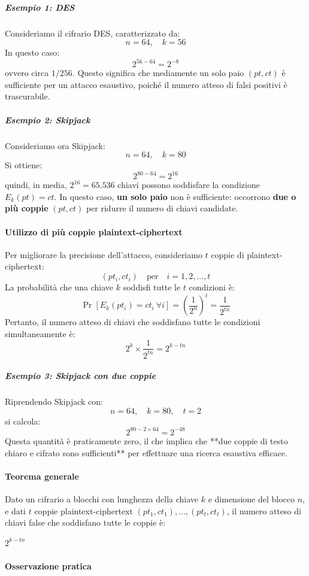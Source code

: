 \documentclass{report}
\begin{document}
\subparagraph{Esempio 1: DES}

Consideriamo il cifrario DES, caratterizzato da:
\[
n = 64, \quad k = 56
\]
In questo caso:
\[
2^{56-64} = 2^{-8}
\]
ovvero circa $1/256$.  
Questo significa che mediamente un solo paio $(pt, ct)$ è sufficiente per un attacco esaustivo, poiché il numero atteso di falsi positivi è trascurabile.

\subparagraph{Esempio 2: Skipjack}

Consideriamo ora Skipjack:
\[
n = 64, \quad k = 80
\]
Si ottiene:
\[
2^{80-64} = 2^{16}
\]
quindi, in media, $2^{16} = 65.536$ chiavi possono soddisfare la condizione $E_k(pt) = ct$.  
In questo caso, \textbf{un solo paio} non è sufficiente: occorrono \textbf{due o più coppie} $(pt, ct)$ per ridurre il numero di chiavi candidate.

\paragraph{Utilizzo di più coppie plaintext-ciphertext}

Per migliorare la precisione dell'attacco, consideriamo $t$ coppie di plaintext-ciphertext:
\[
(pt_i, ct_i) \quad \text{per} \quad i = 1,2,\dots,t
\]
La probabilità che una chiave $k$ soddisfi tutte le $t$ condizioni è:
\[
\Pr\left[E_k(pt_i) = ct_i\ \forall i\right] = \left( \frac{1}{2^n} \right)^t = \frac{1}{2^{tn}}
\]
Pertanto, il numero atteso di chiavi che soddisfano tutte le condizioni simultaneamente è:
\[
2^k \times \frac{1}{2^{tn}} = 2^{k-tn}
\]

\subparagraph{Esempio 3: Skipjack con due coppie}

Riprendendo Skipjack con:
\[
n = 64, \quad k = 80, \quad t = 2
\]
si calcola:
\[
2^{80 - 2\times64} = 2^{-48}
\]
Questa quantità è praticamente zero, il che implica che **due coppie di testo chiaro e cifrato sono sufficienti** per effettuare una ricerca esaustiva efficace.

\paragraph{Teorema generale}
Dato un cifrario a blocchi con lunghezza della chiave $k$ e dimensione del blocco $n$, e dati $t$ coppie plaintext-ciphertext $(pt_1, ct_1), \dots, (pt_t, ct_t)$, il numero atteso di chiavi false che soddisfano tutte le coppie è:

$2^{k - tn}$


\paragraph{Osservazione pratica}
\end{document}
